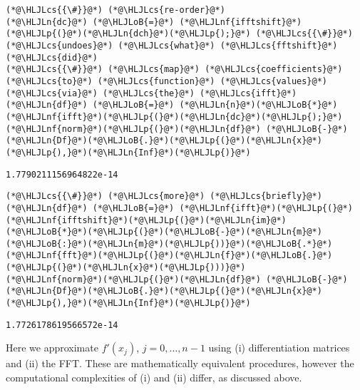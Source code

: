 \documentclass[12pt,a4paper]{article}
\newcommand{\HLJLn}[1]{#1}
\newcommand{\HLJLnf}[1]{\textcolor[RGB]{66,102,213}{#1}}
\newcommand{\HLJLoB}[1]{\textcolor[RGB]{102,102,102}{\textbf{#1}}}
\newcommand{\HLJLp}[1]{#1}
\newcommand{\HLJLcs}[1]{\textcolor[RGB]{153,153,119}{\textit{#1}}}
\begin{document}
\begin{lstlisting}
(*@\HLJLcs{{\#}}@*) (*@\HLJLcs{re-order}@*)
(*@\HLJLn{dc}@*) (*@\HLJLoB{=}@*) (*@\HLJLnf{ifftshift}@*)(*@\HLJLp{(}@*)(*@\HLJLn{dch}@*)(*@\HLJLp{);}@*) (*@\HLJLcs{{\#}}@*) (*@\HLJLcs{undoes}@*) (*@\HLJLcs{what}@*) (*@\HLJLcs{fftshift}@*) (*@\HLJLcs{did}@*)
(*@\HLJLcs{{\#}}@*) (*@\HLJLcs{map}@*) (*@\HLJLcs{coefficients}@*) (*@\HLJLcs{to}@*) (*@\HLJLcs{function}@*) (*@\HLJLcs{values}@*) (*@\HLJLcs{via}@*) (*@\HLJLcs{the}@*) (*@\HLJLcs{ifft}@*)
(*@\HLJLn{df}@*) (*@\HLJLoB{=}@*) (*@\HLJLn{n}@*)(*@\HLJLoB{*}@*)(*@\HLJLnf{ifft}@*)(*@\HLJLp{(}@*)(*@\HLJLn{dc}@*)(*@\HLJLp{);}@*)
(*@\HLJLnf{norm}@*)(*@\HLJLp{(}@*)(*@\HLJLn{df}@*) (*@\HLJLoB{-}@*) (*@\HLJLn{Df}@*)(*@\HLJLoB{.}@*)(*@\HLJLp{(}@*)(*@\HLJLn{x}@*)(*@\HLJLp{),}@*)(*@\HLJLn{Inf}@*)(*@\HLJLp{)}@*)
\end{lstlisting}

\begin{lstlisting}
1.7790211156964822e-14
\end{lstlisting}


\begin{lstlisting}
(*@\HLJLcs{{\#}}@*) (*@\HLJLcs{more}@*) (*@\HLJLcs{briefly}@*)
(*@\HLJLn{df}@*) (*@\HLJLoB{=}@*) (*@\HLJLnf{ifft}@*)(*@\HLJLp{(}@*)(*@\HLJLnf{ifftshift}@*)(*@\HLJLp{(}@*)(*@\HLJLn{im}@*)(*@\HLJLoB{*}@*)(*@\HLJLp{(}@*)(*@\HLJLoB{-}@*)(*@\HLJLn{m}@*)(*@\HLJLoB{:}@*)(*@\HLJLn{m}@*)(*@\HLJLp{))}@*)(*@\HLJLoB{.*}@*)(*@\HLJLnf{fft}@*)(*@\HLJLp{(}@*)(*@\HLJLn{f}@*)(*@\HLJLoB{.}@*)(*@\HLJLp{(}@*)(*@\HLJLn{x}@*)(*@\HLJLp{)))}@*)
(*@\HLJLnf{norm}@*)(*@\HLJLp{(}@*)(*@\HLJLn{df}@*) (*@\HLJLoB{-}@*) (*@\HLJLn{Df}@*)(*@\HLJLoB{.}@*)(*@\HLJLp{(}@*)(*@\HLJLn{x}@*)(*@\HLJLp{),}@*)(*@\HLJLn{Inf}@*)(*@\HLJLp{)}@*)
\end{lstlisting}

\begin{lstlisting}
1.7726178619566572e-14
\end{lstlisting}


Here we approximate $f'(x_j)$, $j = 0, \ldots, n-1$ using (i) differentiation matrices and (ii) the FFT.  These are mathematically equivalent procedures, however the computational complexities of (i) and (ii) differ, as discussed above.
\end{document}

